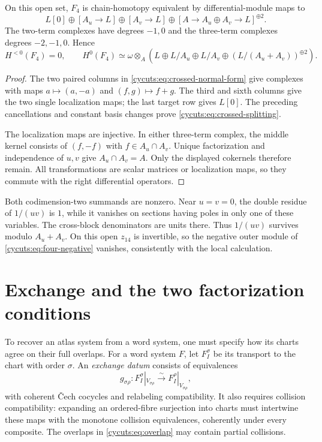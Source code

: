 \begin{theorem}\label{cycuts:thm:crossed}
On this open set, $F_4$ is chain-homotopy equivalent by
differential-module maps to
\begin{equation}\label{cycuts:eq:crossed-splitting}
 L[0]\oplus[A_u\to L]\oplus[A_v\to L]
       \oplus[A\to A_u\oplus A_v\to L]^{\oplus2}.
\end{equation}
The two-term complexes have degrees $-1,0$ and the three-term
complexes degrees $-2,-1,0$. Hence
\[
 H^{<0}(F_4)=0,\qquad
 H^0(F_4)\simeq\omega\otimes_A
 \left(L\oplus L/A_u\oplus L/A_v
                \oplus(L/(A_u+A_v))^{\oplus2}\right).
\]
\end{theorem}
\begin{proof}
The two paired columns in \eqref{cycuts:eq:crossed-normal-form}
give complexes with maps $a\mapsto(a,-a)$ and $(f,g)\mapsto f+g$.
The third and sixth columns give the two single localization maps;
the last target row gives $L[0]$. The preceding cancellations and
constant basis changes prove \eqref{cycuts:eq:crossed-splitting}.

The localization maps are injective. In either three-term complex,
the middle kernel consists of $(f,-f)$ with $f\in A_u\cap A_v$.
Unique factorization and independence of $u,v$ give $A_u\cap A_v=A$.
Only the displayed cokernels therefore remain. All transformations
are scalar matrices or localization maps, so they commute with the
right differential operators.
\end{proof}

Both codimension-two summands are nonzero. Near $u=v=0$, the
double residue of $1/(uv)$ is $1$, while it vanishes on sections
having poles in only one of these variables. The cross-block
denominators are units there. Thus $1/(uv)$ survives modulo
$A_u+A_v$. On this open $z_{14}$ is invertible, so the negative
outer module of \eqref{cycuts:eq:four-negative} vanishes, consistently
with the local calculation.

\section{Exchange and the two factorization conditions}
\label{cycuts:sec:exchange}

To recover an atlas system from a word system, one must specify how
its charts agree on their full overlaps. For a word system $F$,
let $F_I^\sigma$ be its transport to the chart with order $\sigma$.
An \emph{exchange datum} consists of equivalences
\[
 g_{\sigma\rho}:F_I^\sigma|_{V_{\sigma\rho}}
                  \xrightarrow{\sim}F_I^\rho|_{V_{\sigma\rho}},
\]
with coherent \v Cech cocycles and relabeling compatibility. It also
requires collision compatibility: expanding an ordered-fibre
surjection into charts must intertwine these maps with the monotone
collision equivalences, coherently under every composite.
The overlaps in \eqref{cycuts:eq:overlap} may contain partial collisions.


